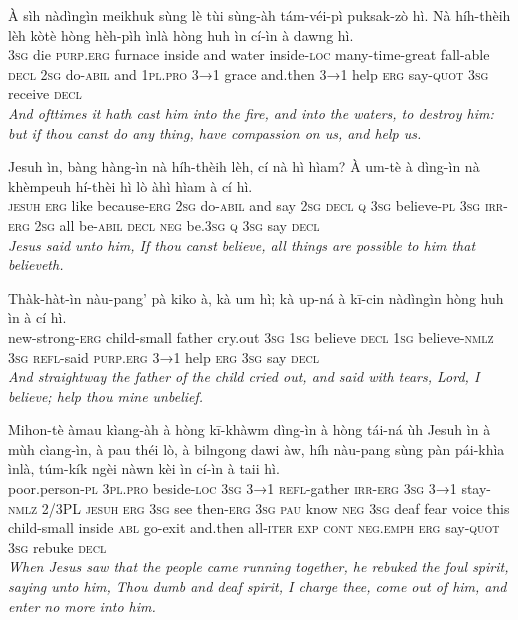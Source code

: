 \documentclass[11pt,a4paper]{article}
\begin{document}
\begin{exe}
\gll À sìh nàdìngìn meikhuk sùng lè tùi sùng-àh tám-véi-pì puksak-zò hì. Nà híh-thèih lèh kòtè hòng hèh-pìh ìnlà hòng huh ìn cí-ìn à dawng hì. \\
     \textsc{3sg} die \textsc{purp}.\textsc{erg} furnace inside and water inside-\textsc{loc} many-time-great fall-able \textsc{decl} \textsc{2sg} do-\textsc{abil} and \textsc{1pl}.\textsc{pro} \textsc{3→1} grace and.then \textsc{3→1} help \textsc{erg} say-\textsc{quot} \textsc{3sg} receive \textsc{decl} \\
\glt \textcolor{kjvcolor}{\textit{And ofttimes it hath cast him into the fire, and into the waters, to destroy him: but if thou canst do any thing, have compassion on us, and help us.}}

\gll Jesuh ìn, bàng hàng-ìn nà híh-thèih lèh, cí nà hì hìam? À um-tè à dìng-ìn nà khèmpeuh hí-thèi hì lò àhì hìam à cí hì. \\
     \textsc{jesuh} \textsc{erg} like because-\textsc{erg} \textsc{2sg} do-\textsc{abil} and say \textsc{2sg} \textsc{decl} \textsc{q} \textsc{3sg} believe-\textsc{pl} \textsc{3sg} \textsc{irr}-\textsc{erg} \textsc{2sg} all be-\textsc{abil} \textsc{decl} \textsc{neg} be.\textsc{3sg} \textsc{q} \textsc{3sg} say \textsc{decl} \\
\glt \textcolor{kjvcolor}{\textit{Jesus said unto him, If thou canst believe, all things are possible to him that believeth.}}

\gll Thàk-hàt-ìn nàu-pang' pà kiko à, kà um hì; kà up-ná à kī-cin nàdìngìn hòng huh ìn à cí hì. \\
     new-strong-\textsc{erg} child-small father cry.out \textsc{3sg} \textsc{1sg} believe \textsc{decl} \textsc{1sg} believe-\textsc{nmlz} \textsc{3sg} \textsc{refl}-said \textsc{purp}.\textsc{erg} \textsc{3→1} help \textsc{erg} \textsc{3sg} say \textsc{decl} \\
\glt \textcolor{kjvcolor}{\textit{And straightway the father of the child cried out, and said with tears, Lord, I believe; help thou mine unbelief.}}

\gll Mihon-tè àmau kìang-àh à hòng kī-khàwm dìng-ìn à hòng tái-ná ùh Jesuh ìn à mùh cìang-ìn, à pau théi lò, à bilngong dawi àw, híh nàu-pang sùng pàn pái-khìa ìnlà, túm-kík ngèi nàwn kèi ìn cí-ìn à taii hì. \\
     poor.person-\textsc{pl} \textsc{3pl}.\textsc{pro} beside-\textsc{loc} \textsc{3sg} \textsc{3→1} \textsc{refl}-gather \textsc{irr}-\textsc{erg} \textsc{3sg} \textsc{3→1} stay-\textsc{nmlz} 2/3PL \textsc{jesuh} \textsc{erg} \textsc{3sg} see then-\textsc{erg} \textsc{3sg} \textsc{pau} know \textsc{neg} \textsc{3sg} deaf fear voice this child-small inside \textsc{abl} go-exit and.then all-\textsc{iter} \textsc{exp} \textsc{cont} \textsc{neg}.\textsc{emph} \textsc{erg} say-\textsc{quot} \textsc{3sg} rebuke \textsc{decl} \\
\glt \textcolor{kjvcolor}{\textit{When Jesus saw that the people came running together, he rebuked the foul spirit, saying unto him, Thou dumb and deaf spirit, I charge thee, come out of him, and enter no more into him.}}


\end{exe}
\end{document}

